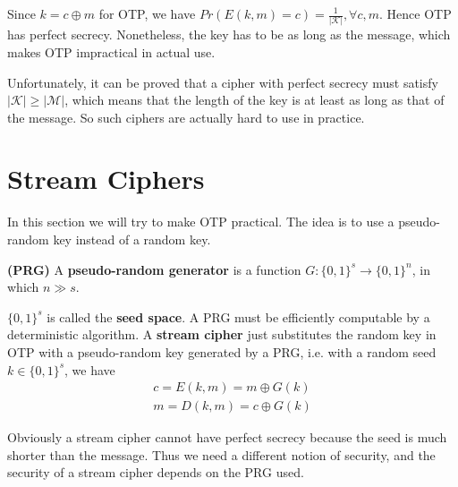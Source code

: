 Since $k=c\oplus m$ for OTP, we have $Pr(E(k,m)=c)=\frac{1}{\lvert\mathcal{K}\rvert},\forall c,m$. Hence OTP has perfect secrecy. Nonetheless, the key has to be as long as the message, which makes OTP impractical in actual use. 

Unfortunately, it can be proved that a cipher with perfect secrecy must satisfy $\lvert\mathcal{K}\rvert\ge\lvert\mathcal{M}\rvert$, which means that the length of the key is at least as long as that of the message. So such ciphers are actually hard to use in practice.
\section{Stream Ciphers}
In this section we will try to make OTP practical. The idea is to use a pseudo-random key instead of a random key. 
\begin{definition} \textbf{(PRG)}
A \textbf{pseudo-random generator} is a function $G:\{0,1\}^s\rightarrow\{0,1\}^n$, in which $n\gg s$. 
\end{definition}
$\{0,1\}^s$ is called the \textbf{seed space}. A PRG must be efficiently computable by a deterministic algorithm. A \textbf{stream cipher} just substitutes the random key in OTP with a pseudo-random key generated by a PRG, i.e. with a random seed $k\in\{0,1\}^s$, we have
\begin{align*}
c=E(k,m)=m\oplus G(k)\\
m=D(k,m)=c\oplus G(k)
\end{align*}

Obviously a stream cipher cannot have perfect secrecy because the seed is much shorter than the message. Thus we need a different notion of security, and the security of a stream cipher depends on the PRG used. 

